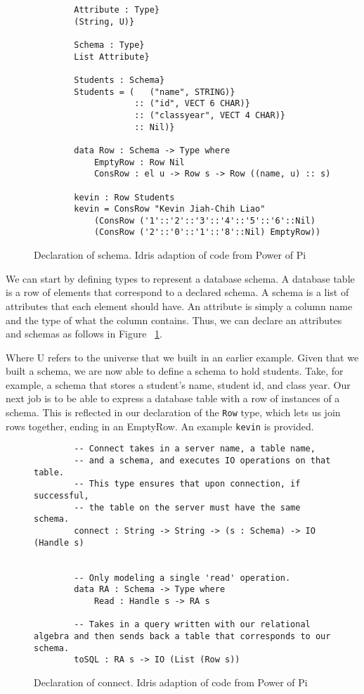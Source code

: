 \begin{figure}[h]
    \caption{Declaration of schema. Idris adaption of code from Power of Pi
    \cite{power_of_pi}}
    \label{schema}
    \begin{lstlisting}
        Attribute : Type}
        (String, U)}

        Schema : Type}
        List Attribute}

        Students : Schema}
        Students = (   ("name", STRING)}
                    :: ("id", VECT 6 CHAR)} 
                    :: ("classyear", VECT 4 CHAR)}
                    :: Nil)}

        data Row : Schema -> Type where
            EmptyRow : Row Nil
            ConsRow : el u -> Row s -> Row ((name, u) :: s)

        kevin : Row Students
        kevin = ConsRow "Kevin Jiah-Chih Liao"
            (ConsRow ('1'::'2'::'3'::'4'::'5'::'6'::Nil)
            (ConsRow ('2'::'0'::'1'::'8'::Nil) EmptyRow))
    \end{lstlisting}
\end{figure}

We can start by defining types to represent a database schema. A database table
is a row of elements that correspond to a declared schema. A schema is a list of
attributes that each element should have. An attribute is simply a column name
and the type of what the column contains. Thus, we can declare an attributes and
schemas as follows in Figure ~\ref{schema}. 


Where U refers to the universe that we built in an earlier example. Given that
we built a schema, we are now able to define a schema to hold students. Take,
for example, a schema that stores a student's name, student id, and class year.
Our next job is to be able to express a database table with a row of instances
of a schema. This is reflected in our declaration of the \texttt{Row} type,
which lets us join rows together, ending in an EmptyRow. An example
\texttt{kevin} is provided. 

\begin{figure}[ht!]
    \caption{Declaration of connect. Idris adaption of code from Power of Pi
    \cite{power_of_pi}}
    \label{connect}
    \begin{lstlisting}
        -- Connect takes in a server name, a table name, 
        -- and a schema, and executes IO operations on that table. 
        -- This type ensures that upon connection, if successful, 
        -- the table on the server must have the same schema. 
        connect : String -> String -> (s : Schema) -> IO (Handle s)

        
        -- Only modeling a single 'read' operation. 
        data RA : Schema -> Type where
            Read : Handle s -> RA s
        
        -- Takes in a query written with our relational algebra and then sends back a table that corresponds to our schema. 
        toSQL : RA s -> IO (List (Row s))
    \end{lstlisting}
\end{figure}

